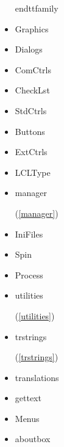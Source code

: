\documentclass{report}
\begin{document}
\begin{itemize}
end{ttfamily}\item \begin{ttfamily}Graphics\end{ttfamily}\item \begin{ttfamily}Dialogs\end{ttfamily}\item \begin{ttfamily}ComCtrls\end{ttfamily}\item \begin{ttfamily}CheckLst\end{ttfamily}\item \begin{ttfamily}StdCtrls\end{ttfamily}\item \begin{ttfamily}Buttons\end{ttfamily}\item \begin{ttfamily}ExtCtrls\end{ttfamily}\item \begin{ttfamily}LCLType\end{ttfamily}\item \begin{ttfamily}manager\end{ttfamily}(\ref{manager})\item \begin{ttfamily}IniFiles\end{ttfamily}\item \begin{ttfamily}Spin\end{ttfamily}\item \begin{ttfamily}Process\end{ttfamily}\item \begin{ttfamily}utilities\end{ttfamily}(\ref{utilities})\item \begin{ttfamily}trstrings\end{ttfamily}(\ref{trstrings})\item \begin{ttfamily}translations\end{ttfamily}\item \begin{ttfamily}gettext\end{ttfamily}\item \begin{ttfamily}Menus\end{ttfamily}\item \begin{ttfamily}aboutbox\end{ttfamily}\end{itemize}
\end{document}
